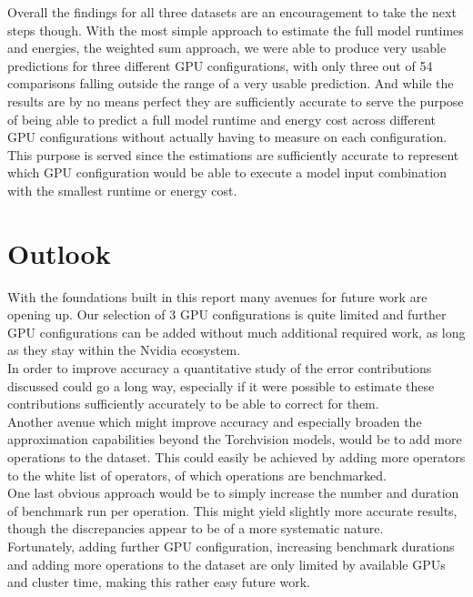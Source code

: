 \documentclass[conference]{IEEEtran}
\begin{document}
Overall the findings for all three datasets are an encouragement to take the next steps though. With the most simple approach to estimate the full model runtimes and energies, the weighted sum approach, we were able to produce very usable predictions for three different GPU configurations, with only three out of 54 comparisons falling outside the range of a very usable prediction. And while the results are by no means perfect they are sufficiently accurate to serve the purpose of being able to predict a full model runtime and energy cost across different GPU configurations without actually having to measure on each configuration. This purpose is served since the estimations are sufficiently accurate to represent which GPU configuration would be able to execute a model input combination with the smallest runtime or energy cost.


\section{Outlook}
With the foundations built in this report many avenues for future work are opening up. Our selection of 3 GPU configurations is quite limited and further GPU configurations can be added without much additional required work, as long as they stay within the Nvidia ecosystem. \\
In order to improve accuracy a quantitative study of the error contributions discussed could go a long way, especially if it were possible to estimate these contributions sufficiently accurately to be able to correct for them. \\
Another avenue which might improve accuracy and especially broaden the approximation capabilities beyond the Torchvision models, would be to add more operations to the dataset. This could easily be achieved by adding more operators to the white list of operators, of which operations are benchmarked. \\
One last obvious approach would be to simply increase the number and duration of benchmark run per operation. This might yield slightly more accurate results, though the discrepancies appear to be of a more systematic nature. \\
Fortunately, adding further GPU configuration, increasing benchmark durations and adding more operations to the dataset are only limited by available GPUs and cluster time, making this rather easy future work.
\end{document}
